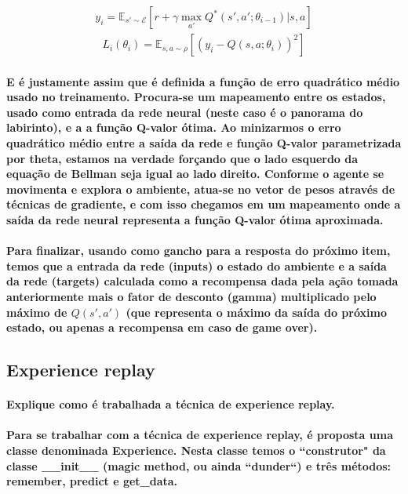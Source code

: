 \documentclass[a4paper]{article}    %
\begin{document}
\begin{align*}
    y_i = \mathbb{E}_{s'\sim \mathcal{E}}\left[r+\gamma\max_{a'}Q^*(s',a';\theta_{i-1})|s,a\right]
\end{align*} 
\begin{align*}
    L_i(\theta_i) = \mathbb{E}_{s,a\sim\rho}\left[(y_i - Q(s,a;\theta_i))^2\right]
\end{align*} 

\paragraph{E é justamente assim que é definida a função de erro quadrático médio usado no treinamento. Procura-se um mapeamento entre os estados, usado como entrada da rede neural (neste caso é o panorama do labirinto), e a a função Q-valor ótima. Ao minizarmos o erro quadrático médio entre a saída da rede e função Q-valor parametrizada por theta, estamos na verdade forçando que o lado esquerdo da equação de Bellman seja igual ao lado direito. Conforme o agente se movimenta e explora o ambiente, atua-se no vetor de pesos através de técnicas de gradiente, e com isso chegamos em um mapeamento onde a saída da rede neural representa a função Q-valor ótima aproximada.}

\paragraph{Para finalizar, usando como gancho para a resposta do próximo item, temos que a entrada da rede (inputs) o estado do ambiente e a saída da rede (targets) calculada como a recompensa dada pela ação tomada anteriormente mais o fator de desconto (gamma) multiplicado pelo máximo de $Q(s',a')$ (que representa o máximo da saída do próximo estado, ou apenas a recompensa em caso de game over).}

\newpage
\subsection{Experience replay}

\paragraph{Explique como é trabalhada a técnica de experience replay.}

\paragraph{Para se trabalhar com a técnica de experience replay, é proposta uma classe denominada Experience. Nesta classe temos o ``construtor" da classe \_\_init\_\_ (magic method, ou ainda ``dunder``) e três métodos: remember, predict e get\_data.}
\end{document}
